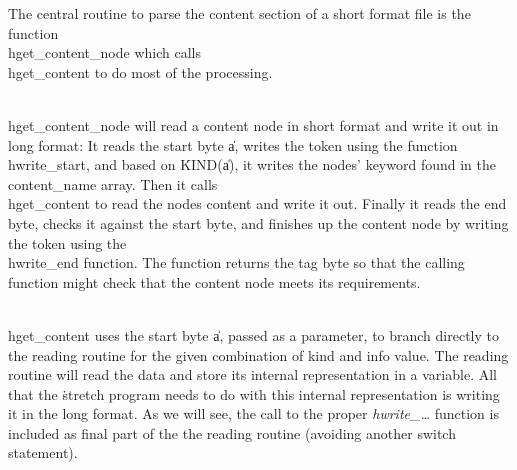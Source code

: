 

The central routine to parse the content section of a short format
file is the function \\{hget\_content\_node} which calls \\{hget\_content} to
do most of the processing.

\\{hget\_content\_node} will read a content node in short format and write
it out in long format: It reads the start byte \|a, writes the 
token using the function \\{hwrite\_start}, and based on \.{KIND}(\|a), it
writes the nodes' keyword found in the \\{content\_name} array.  Then it
calls \\{hget\_content} to read the nodes content and write it out.
Finally it reads the end byte, checks it against the start byte, and
finishes up the content node by writing the  token using the
\\{hwrite\_end} function. The function returns the tag byte so that
the calling function might check that the content node meets its requirements.

\\{hget\_content} uses the start byte \|a, passed as a parameter, to
branch directly to the reading routine for the given combination of
kind and info value.  The reading routine will read the data and store
its internal representation in a variable.  All that the \.{stretch}
program needs to do with this internal representation is writing it in
the long format. As we will see, the call to the proper
{\it hwrite\_\kern 1pt\dots} function is included as final part of the the
reading routine (avoiding another switch statement).


